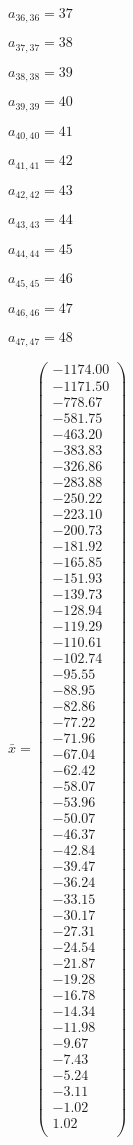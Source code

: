 \documentclass[a4paper,12pt]{article}
\begin{document}
$a _{ 36, 36 } = 37$

$a _{ 37, 37 } = 38$

$a _{ 38, 38 } = 39$

$a _{ 39, 39 } = 40$

$a _{ 40, 40 } = 41$

$a _{ 41, 41 } = 42$

$a _{ 42, 42 } = 43$

$a _{ 43, 43 } = 44$

$a _{ 44, 44 } = 45$

$a _{ 45, 45 } = 46$

$a _{ 46, 46 } = 47$

$a _{ 47, 47 } = 48$

$\bar { x } = \begin{pmatrix}
-1174.00 \\
-1171.50 \\
-778.67 \\
-581.75 \\
-463.20 \\
-383.83 \\
-326.86 \\
-283.88 \\
-250.22 \\
-223.10 \\
-200.73 \\
-181.92 \\
-165.85 \\
-151.93 \\
-139.73 \\
-128.94 \\
-119.29 \\
-110.61 \\
-102.74 \\
-95.55 \\
-88.95 \\
-82.86 \\
-77.22 \\
-71.96 \\
-67.04 \\
-62.42 \\
-58.07 \\
-53.96 \\
-50.07 \\
-46.37 \\
-42.84 \\
-39.47 \\
-36.24 \\
-33.15 \\
-30.17 \\
-27.31 \\
-24.54 \\
-21.87 \\
-19.28 \\
-16.78 \\
-14.34 \\
-11.98 \\
-9.67 \\
-7.43 \\
-5.24 \\
-3.11 \\
-1.02 \\
1.02 \\
\end{pmatrix}
$
\end{document}
